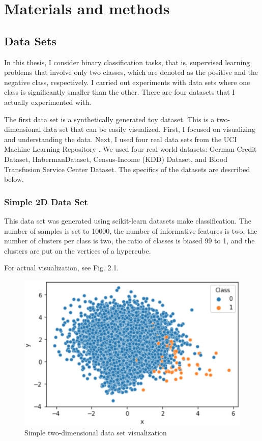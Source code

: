 \chapter{Materials and methods}
\section{Data Sets}

In this thesis, I consider binary classification tasks, that is, supervised learning problems that involve only two classes, which are denoted as the positive and the negative class, respectively. I carried out experiments with data sets where one class is significantly smaller than the other. There are four datasets that I actually experimented with. 

The first data set is a synthetically generated toy dataset. This is a two-dimensional data set that can be easily visualized. First, I focused on visualizing and understanding the data. Next, I used four real data sets from the UCI Machine Learning Repository \cite{UCI}. We used four real-world datasets: German Credit Dataset, HabermanDataset, Census-Income (KDD) Dataset, and Blood Transfusion Service Center Dataset. The specifics of the datasets are described below.

\subsection{Simple 2D Data Set}
This data set was generated using scikit-learn datasets make classification.
The number of samples is set to 10000, the number of informative features is two,
the number of clusters per class is two, the ratio of classes is biased 99 to 1, and the clusters are put on the vertices of a hypercube.

For actual visualization, see Fig. 2.1.
\begin{center}
    \begin{figure}[ht]
        \caption{Simple two-dimensional data set visualization}
        \label{tab:team-rating-features}
        \begin{center}
            \includegraphics[scale=0.8]{image/data1.eps}
        \end{center}
    \end{figure}
\end{center}



